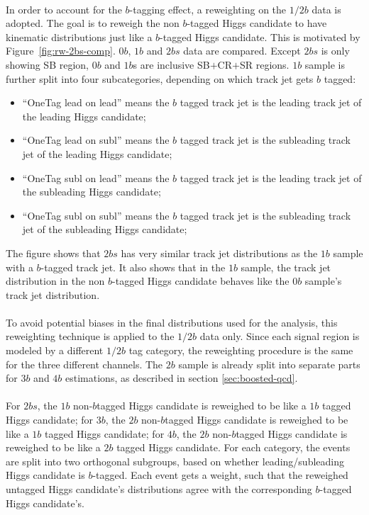 \paragraph{}
In order to account for the $b$-tagging effect, a reweighting on the $1/2b$ data is adopted. 
The goal is to reweigh the non $b$-tagged Higgs candidate to have kinematic distributions just like a $b$-tagged Higgs candidate. 
This is motivated by Figure~\ref{fig:rw-2bs-comp}.
$0b$, $1b$ and $2bs$ data are compared.
Except $2bs$ is only showing SB region, $0b$ and $1b$s are inclusive SB$+$CR$+$SR regions.
$1b$ sample is further split into four subcategories, depending on which track jet gets $b$ tagged:
\begin{itemize}
\item ``OneTag lead on lead'' means the $b$ tagged track jet is the leading track jet of the leading Higgs candidate;
\item ``OneTag lead on subl'' means the $b$ tagged track jet is the subleading track jet of the leading Higgs candidate;
\item ``OneTag subl on lead'' means the $b$ tagged track jet is the leading track jet of the subleading Higgs candidate; 
\item ``OneTag subl on subl'' means the $b$ tagged track jet is the subleading track jet of the subleading Higgs candidate;
\end{itemize}
The figure shows that $2bs$ has very similar track jet \pt distributions as the $1b$ sample with a $b$-tagged track jet.
It also shows that in the $1b$ sample, the track jet \pt distribution in the non $b$-tagged Higgs candidate behaves like the $0b$ sample's track jet \pt distribution.

\paragraph{}
To avoid potential biases in the final distributions used for the analysis, this reweighting technique is applied to the $1/2b$ data only. 
Since each signal region is modeled by a different $1/2b$ tag category, the reweighting procedure is the same for the three different channels. 
The $2b$ sample is already split into separate parts for $3b$ and $4b$ estimations, as described in section \ref{sec:boosted-qcd}.

\paragraph{}
For $2bs$, the $1b$ non-$b$tagged Higgs candidate is reweighed to be like a $1b$ tagged Higgs candidate; for $3b$, the $2b$ non-$b$tagged Higgs candidate is reweighed to be like a $1b$ tagged Higgs candidate; for $4b$, the $2b$ non-$b$tagged Higgs candidate is reweighed to be like a $2b$ tagged Higgs candidate.
For each category, the events are split into two orthogonal subgroups, based on whether leading/subleading Higgs candidate is $b$-tagged.
Each event gets a weight, such that the reweighed untagged Higgs candidate's distributions agree with the corresponding $b$-tagged Higgs candidate's.


